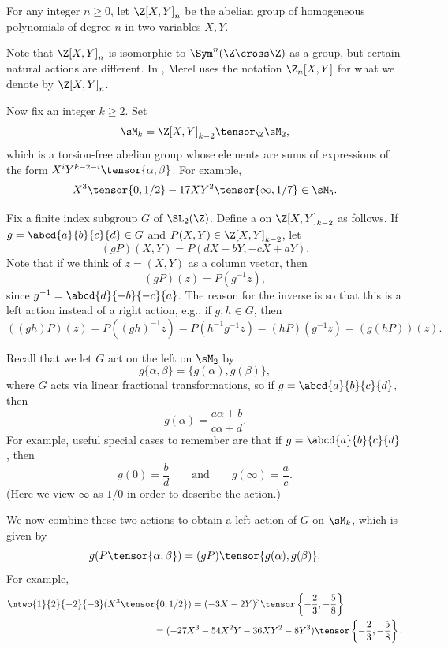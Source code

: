 For any integer $n\geq 0$, let
$\Z[X,Y]_n$ be the abelian group of homogeneous polynomials of
degree $n$ in two variables $X,Y$.

\begin{remark}
Note that $\Z[X,Y]_n$ is isomorphic
to $\Sym^{n}(\Z\cross \Z)$ as a group, but certain natural actions are
different. In \cite{merel:1585}, Merel
uses the notation $\Z_{n}[X,Y]$ for what we
denote by $\Z[X,Y]_{n}$.
\end{remark}
Now fix an integer $k\geq 2$.
Set
$$
     \sM_k = \Z[X,Y]_{k-2} \tensor_\Z \sM_2,
$$
which is a torsion-free abelian group whose elements are
sums of expressions of the form $X^{i}Y^{k-2-i}\tensor \{\alpha,\beta\}$.
For example, 
$$
    X^3 \tensor \{0,1/2\} -17 XY^2 \tensor \{\infty,1/7\} \in \sM_{5}.
$$

Fix a finite index subgroup $G$ of $\SL_2(\Z)$. 
Define a  on $\Z[X,Y]_{k-2}$ as follows.  If
$g=\abcd{a}{b}{c}{d}\in G$ and $P(X,Y)\in \Z[X,Y]_{k-2}$, let
$$(g P)(X,Y) = P(dX-bY, -cX+aY).$$
Note that if we think of $z=(X,Y)$
as a column vector, then $$(g P)(z) = P(g^{-1}z),$$
since $g^{-1} =
\abcd{\hfill{}d}{-b}{-c}{\hfill{}a}$.  The reason
for the inverse is so that this is a left action instead of a right
action, e.g., if $g,h\in G$, then 
$$
((gh)P)(z) = P((gh)^{-1}z) = P(h^{-1}g^{-1}z) =
(hP)(g^{-1}z) = (g(hP))(z).  
$$

Recall that we let $G$ act on the left on $\sM_2$ by 
$$
 g\{\alpha, \beta\} = \{g(\alpha), g(\beta)\},
$$
where $G$ acts via linear fractional transformations,
so if $g=\abcd{a}{b}{c}{d}$, then 
$$g(\alpha)=\frac{a\alpha + b}{c\alpha + d}.$$
For example, useful special cases to remember are that if $g=\abcd{a}{b}{c}{d}$, then
$$
g(0) = \frac{b}{d} \qquad\text{and}\qquad g(\infty) = \frac{a}{c}.
$$
(Here we view $\infty$ as $1/0$ in order to describe the
action.)

We now combine these two actions to obtain a left action of $G$ on $\sM_{k}$, 
which is given by
$$
  g(P \tensor \{\alpha, \beta\}) = (gP) \tensor\{g(\alpha), g(\beta)\}.
$$
For example, 
\begin{align*}
  \mtwo{\hfill 1}{\hfill 2}{-2}{-3} (X^3 \tensor \{0,1/2\}) &=  
     (-3X - 2Y)^3 \tensor\left\{-\frac{2}{3},  -\frac{5}{8}\right\} \\
  &\hspace{-4em}= (-27X^3 - 54X^2Y - 36XY^2 - 8Y^3)\tensor \left\{-\frac{2}{3},  -\frac{5}{8}\right\}.
\end{align*}

